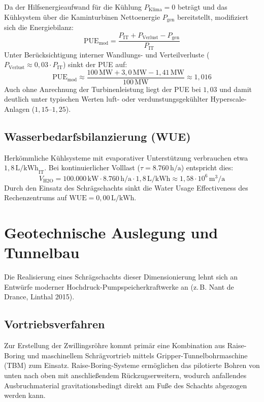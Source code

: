 \documentclass[journal]{IEEEtran}
\begin{document}
Da der Hilfsenergieaufwand für die Kühlung $P_{\text{Klima}} = 0$ beträgt und das Kühlsystem über die Kaminturbinen Nettoenergie $P_{\text{gen}}$ bereitstellt, modifiziert sich die Energiebilanz:
\begin{equation}
\text{PUE}_{\text{mod}} = \frac{P_{\text{IT}} + P_{\text{Verlust}} - P_{\text{gen}}}{P_{\text{IT}}}
\end{equation}
Unter Berücksichtigung interner Wandlungs- und Verteilverluste ($P_{\text{Verlust}} \approx 0{,}03 \cdot P_{\text{IT}}$) sinkt der PUE auf:
\begin{equation}
\text{PUE}_{\text{mod}} \approx \frac{100\,\text{MW} + 3{,}0\,\text{MW} - 1{,}41\,\text{MW}}{100\,\text{MW}} \approx 1{,}016
\end{equation}
Auch ohne Anrechnung der Turbinenleistung liegt der PUE bei $1{,}03$ und damit deutlich unter typischen Werten luft- oder verdunstungsgekühlter Hyperscale-Anlagen ($1{,}15$--$1{,}25$).

\subsection{Wasserbedarfsbilanzierung (WUE)}
Herkömmliche Kühlsysteme mit evaporativer Unterstützung verbrauchen etwa $1{,}8\,\text{L/kWh}_{\text{IT}}$. Bei kontinuierlicher Volllast ($\tau = 8.760\,\text{h/a}$) entspricht dies:
\begin{equation}
V_{\text{H2O}} = 100.000\,\text{kW} \cdot 8.760\,\text{h/a} \cdot 1{,}8\,\text{L/kWh} \approx 1{,}58 \cdot 10^6\,\text{m}^3/\text{a}
\end{equation}
Durch den Einsatz des Schrägschachts sinkt die Water Usage Effectiveness des Rechenzentrums auf $\text{WUE} = 0{,}00\,\text{L/kWh}$.

\section{Geotechnische Auslegung und Tunnelbau}
Die Realisierung eines Schrägschachts dieser Dimensionierung lehnt sich an Entwürfe moderner Hochdruck-Pumpspeicherkraftwerke an (z.\,B. Nant de Drance, Linthal 2015).

\subsection{Vortriebsverfahren}
Zur Erstellung der Zwillingsröhre kommt primär eine Kombination aus Raise-Boring und maschinellem Schrägvortrieb mittels Gripper-Tunnelbohrmaschine (TBM) zum Einsatz. Raise-Boring-Systeme ermöglichen das pilotierte Bohren von unten nach oben mit anschließendem Rückzugserweitern, wodurch anfallendes Ausbruchmaterial gravitationsbedingt direkt am Fuße des Schachts abgezogen werden kann.
\end{document}
